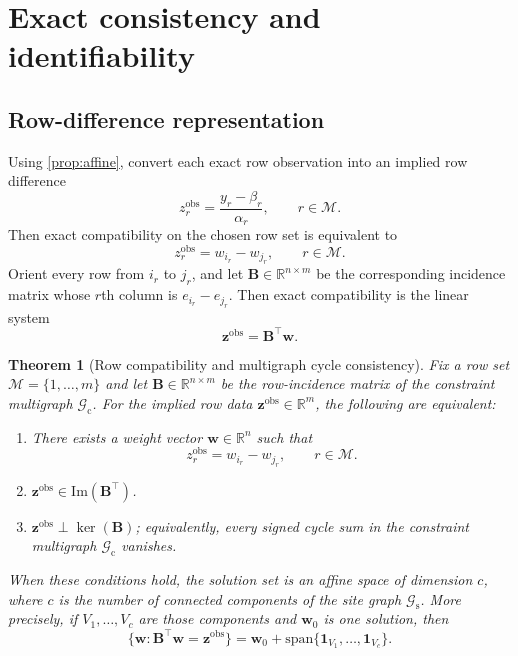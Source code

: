 \documentclass[preprint,12pt]{elsarticle}
\newtheorem{theorem}{Theorem}
\newcommand{\R}{\mathbb{R}}
\newcommand{\weights}{\mathbf{w}}
\newcommand{\rowset}{\mathcal{M}}
\newcommand{\cgraph}{\mathcal{G}_{\mathrm{c}}}
\newcommand{\sitegraph}{\mathcal{G}_{\mathrm{s}}}
\newcommand{\inc}{\mathbf{B}}
\begin{document}
\section{Exact consistency and identifiability}
\label{sec:consistency}

\subsection{Row-difference representation}
Using \cref{prop:affine}, convert each exact row observation into an implied row
difference
\begin{equation}
    z_r^{\mathrm{obs}} = \frac{y_r-\beta_r}{\alpha_r},
    \qquad r\in\rowset.
\end{equation}
Then exact compatibility on the chosen row set is equivalent to
\begin{equation}
    z_r^{\mathrm{obs}} = w_{i_r}-w_{j_r},
    \qquad r\in\rowset.
\end{equation}
Orient every row from $i_r$ to $j_r$, and let
$\inc\in\R^{n\times m}$ be the corresponding incidence matrix whose $r$th column
is $e_{i_r}-e_{j_r}$. Then exact compatibility is the linear system
\begin{equation}
    \mathbf{z}^{\mathrm{obs}} = \inc^\top\weights.
\end{equation}

\begin{theorem}[Row compatibility and multigraph cycle consistency]
\label{thm:cycle}
Fix a row set $\rowset=\{1,\dots,m\}$ and let
$\inc\in\R^{n\times m}$ be the row-incidence matrix of the constraint
multigraph $\cgraph$. For the implied row data
$\mathbf{z}^{\mathrm{obs}}\in\R^m$, the following are equivalent:
\begin{enumerate}
    \item There exists a weight vector $\weights\in\R^n$ such that
    \begin{equation}
        z_r^{\mathrm{obs}}=w_{i_r}-w_{j_r},
        \qquad r\in\rowset.
    \end{equation}
    \item $\mathbf{z}^{\mathrm{obs}}\in\mathrm{Im}(\inc^\top)$.
    \item $\mathbf{z}^{\mathrm{obs}}\perp\ker(\inc)$; equivalently, every
    signed cycle sum in the constraint multigraph $\cgraph$ vanishes.
\end{enumerate}
When these conditions hold, the solution set is an affine space of dimension
$c$, where $c$ is the number of connected components of the site graph
$\sitegraph$. More precisely, if $V_1,\dots,V_c$ are those components and
$\weights_0$ is one solution, then
\begin{equation}
    \{\weights:\inc^\top\weights=\mathbf{z}^{\mathrm{obs}}\}
    =
    \weights_0+\mathrm{span}\{\mathbf{1}_{V_1},\dots,\mathbf{1}_{V_c}\}.
\end{equation}
\end{theorem}
\end{document}
